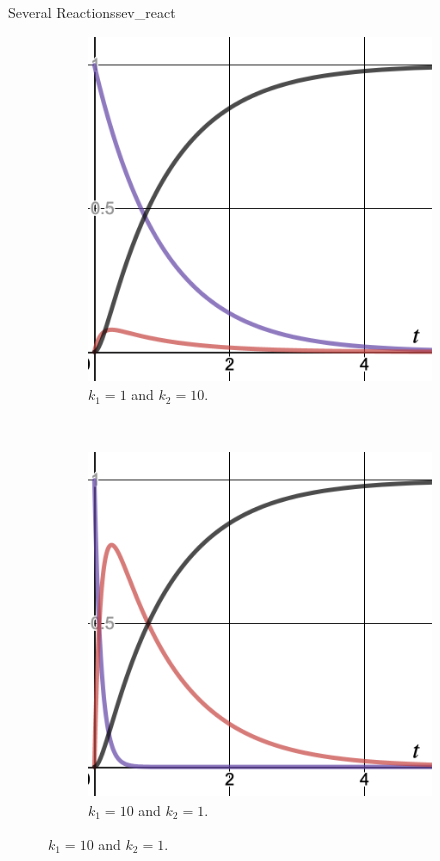 \begin{ex}{Several Reactions}{sev_react}
\begin{figure}[H]
\begin{subfigure}[h]{0.3\textwidth}
        \includegraphics[width=\textwidth]{Figures_Part_2/k1=1k2=10.png}
        \caption{$k_1=1$ and $k_2=10$.}
    \end{subfigure}
    ~
    \begin{subfigure}[h]{0.3\textwidth}
        \includegraphics[width=\textwidth]{Figures_Part_2/k1=10k2=1.png}
        \caption{$k_1=10$ and $k_2=1$.}
    \end{subfigure}


\end{figure}
\end{ex}
